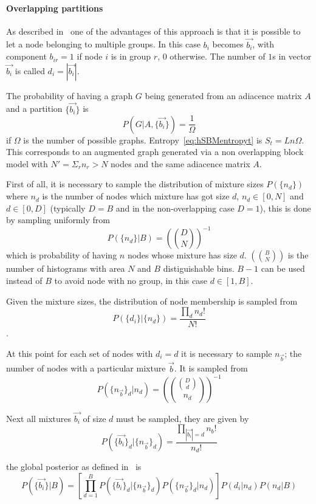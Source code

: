 
\paragraph{Overlapping partitions}
As described in~\cite{peixoto2015model} one of the advantages of this approach
is that it is possible to let a node belonging to multiple groups.
In this case $b_i$ becomes $\vec{b_i}$, with component $b_{ir}=1$ if node $i$ is in
group $r$, $0$ otherwise. The number of $1$s in vector $\vec{b_i}$ is called
$d_i=|\vec{b_i}|$.

The probability of having a graph $G$ being generated from an adiacence matrix
$A$ and a partition $\{\vec{b_i}\}$ is \[P(G|A,\{\vec{b_i}\})=\frac{1}{\Omega}\]
if $\Omega$ is the number of possible graphs. Entropy~\ref{eq:hSBMentropyt} is
$S_t=Ln\Omega$. This corresponds to an augmented graph generated via a
non overlapping block model with $N'=\Sigma_r n_r>N$ nodes and the same
adiacence matrix $A$.

First of all, it is necessary to sample the distribution of mixture sizes
$P(\{n_d\})$ where $n_d$ is the number of nodes which mixture has got size $d$, $n_d\in[0,N]$ and $d\in[0,D]$ (typically $D=B$
and in the non-overlapping case $D=1$), this is done by sampling uniformly from
\[P(\{n_d\}|B)=\left(\binom{D}{N}\right)^{-1}\] which is probability of having $n$ nodes whose mixture has size $d$.
$\left(\binom{B}{N}\right)$ is the number of histograms with
area $N$ and $B$ distiguishable bins. $B-1$ can be used instead of $B$ to avoid node with no group, in this case $d\in[1,B]$.

Given the mixture sizes, the distribution of node membership
is sampled from \[P(\{d_i\}|\{n_d\})=\frac{\prod_{d} n_d!}{N!}\].

At this point for each set of nodes with $d_i=d$ it is necessary to sample $n_{\vec{b}}$; the number of nodes
with a particular mixture $\vec{b}$.
It is sampled from
\begin{equation}
  P(\{n_{\vec{b}}\}_d|n_d)=\left(\binom{\binom{D}{d}}{n_d}\right)^{-1}
\end{equation}

Next all mixtures $\vec{b_i}$ of size $d$ must be sampled, they are given by
\begin{equation}
  P(\{\vec{b_i}\}_d|\{n_{\vec{b}}\}_d)=\frac{\prod_{|\vec{b_i}|=d} n_b!}{n_d!}
\end{equation}

the global posterior as defined in~\cite{peixoto2015model} is
\begin{equation}
  P(\{\vec{b_i}\}|B)=\left[\prod_{d=1}^B  P(\{\vec{b_i}\}_d|\{n_{\vec{b}}\}_d) P(\{n_{\vec{b}}\}_d|n_d)\right]P({d_i}|{n_d})P(n_d|B)
\end{equation}

